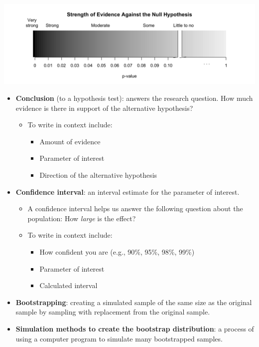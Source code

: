 \documentclass[
]{report}
\begin{document}
\begin{center}\includegraphics[width=0.9\linewidth]{images/soe_gradient_gray} \end{center}

\begin{itemize}
\item
  \textbf{Conclusion} (to a hypothesis test): answers the research question. How much evidence is there in support of the alternative hypothesis?

  \begin{itemize}
  \item
    To write in context include:

    \begin{itemize}
    \item
      Amount of evidence
    \item
      Parameter of interest
    \item
      Direction of the alternative hypothesis
    \end{itemize}
  \end{itemize}
\item
  \textbf{Confidence interval}: an interval estimate for the parameter of interest.

  \begin{itemize}
  \item
    A confidence interval helps us answer the following question about the population: How \emph{large} is the effect?
  \item
    To write in context include:

    \begin{itemize}
    \item
      How confident you are (e.g., 90\%, 95\%, 98\%, 99\%)
    \item
      Parameter of interest
    \item
      Calculated interval
    \end{itemize}
  \end{itemize}
\item
  \textbf{Bootstrapping}: creating a simulated sample of the same size as the original sample by sampling with replacement from the original sample.
\item
  \textbf{Simulation methods to create the bootstrap distribution}: a process of using a computer program to simulate many bootstrapped samples.


\end{itemize}
\end{document}

